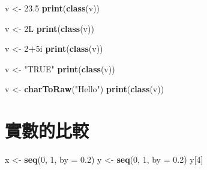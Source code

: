 \documentclass[]{book}
\newenvironment{Shaded}{\begin{snugshade}}{\end{snugshade}}
\newcommand{\KeywordTok}[1]{\textcolor[rgb]{0.13,0.29,0.53}{\textbf{#1}}}
\newcommand{\DataTypeTok}[1]{\textcolor[rgb]{0.13,0.29,0.53}{#1}}
\newcommand{\DecValTok}[1]{\textcolor[rgb]{0.00,0.00,0.81}{#1}}
\newcommand{\FloatTok}[1]{\textcolor[rgb]{0.00,0.00,0.81}{#1}}
\newcommand{\StringTok}[1]{\textcolor[rgb]{0.31,0.60,0.02}{#1}}
\newcommand{\OperatorTok}[1]{\textcolor[rgb]{0.81,0.36,0.00}{\textbf{#1}}}
\newcommand{\NormalTok}[1]{#1}
\theoremstyle{definition}
\theoremstyle{definition}
\theoremstyle{definition}
\theoremstyle{remark}
\begin{document}
\begin{Shaded}
\begin{Highlighting}[]
\NormalTok{v <-}\StringTok{ }\FloatTok{23.5}
\KeywordTok{print}\NormalTok{(}\KeywordTok{class}\NormalTok{(v))}
\end{Highlighting}
\end{Shaded}

\begin{Shaded}
\begin{Highlighting}[]
\NormalTok{v <-}\StringTok{ }\NormalTok{2L}
\KeywordTok{print}\NormalTok{(}\KeywordTok{class}\NormalTok{(v))}
\end{Highlighting}
\end{Shaded}

\begin{Shaded}
\begin{Highlighting}[]
\NormalTok{v <-}\StringTok{ }\DecValTok{2}\OperatorTok{+}\NormalTok{5i}
\KeywordTok{print}\NormalTok{(}\KeywordTok{class}\NormalTok{(v))}
\end{Highlighting}
\end{Shaded}

\begin{Shaded}
\begin{Highlighting}[]
\NormalTok{v <-}\StringTok{ "TRUE"}
\KeywordTok{print}\NormalTok{(}\KeywordTok{class}\NormalTok{(v))}
\end{Highlighting}
\end{Shaded}

\begin{Shaded}
\begin{Highlighting}[]
\NormalTok{v <-}\StringTok{ }\KeywordTok{charToRaw}\NormalTok{(}\StringTok{"Hello"}\NormalTok{)}
\KeywordTok{print}\NormalTok{(}\KeywordTok{class}\NormalTok{(v))}
\end{Highlighting}
\end{Shaded}

\section{實數的比較}

\begin{Shaded}
\begin{Highlighting}[]
\NormalTok{x <-}\StringTok{ }\KeywordTok{seq}\NormalTok{(}\DecValTok{0}\NormalTok{, }\DecValTok{1}\NormalTok{, }\DataTypeTok{by =} \FloatTok{0.2}\NormalTok{)}
\NormalTok{y <-}\StringTok{ }\KeywordTok{seq}\NormalTok{(}\DecValTok{0}\NormalTok{, }\DecValTok{1}\NormalTok{, }\DataTypeTok{by =} \FloatTok{0.2}\NormalTok{)}
\NormalTok{y[}\DecValTok{4}\NormalTok{]}
\end{Highlighting}
\end{Shaded}
\end{document}
